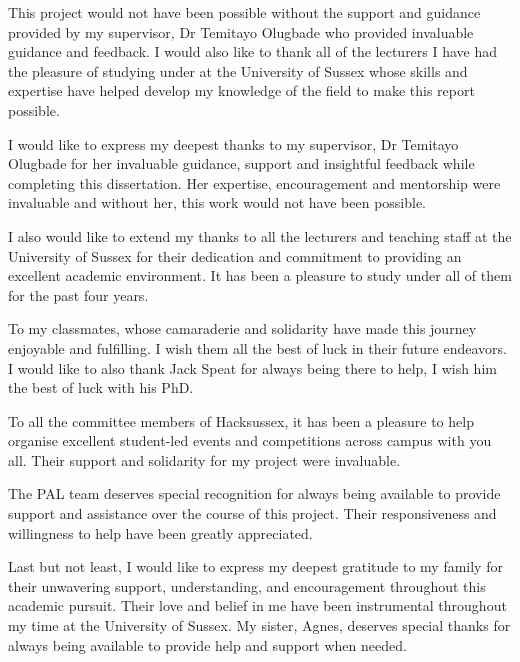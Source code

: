 \documentclass{report}
\begin{document}
This project would not have been possible without the support and guidance provided by my supervisor, Dr Temitayo Olugbade who provided invaluable guidance and feedback. I would also like to thank all of the lecturers I have had the pleasure of studying under at the University of Sussex whose skills and expertise have helped develop my knowledge of the field to make this report possible. 

I would like to express my deepest thanks to my supervisor, Dr Temitayo Olugbade for her invaluable guidance, support and insightful feedback while completing this dissertation. Her expertise, encouragement and mentorship were invaluable and without her, this work would not have been possible. 

I also would like to extend my thanks to all the lecturers and teaching staff at the University of Sussex for their dedication and commitment to providing an excellent academic environment. It has been a pleasure to study under all of them for the past four years. 

To my classmates, whose camaraderie and solidarity have made this journey enjoyable and fulfilling. I wish them all the best of luck in their future endeavors. I would like to also thank Jack Speat for always being there to help, I wish him the best of luck with his PhD. 

To all the committee members of Hacksussex, it has been a pleasure to help organise excellent student-led events and competitions across campus with you all. Their support and solidarity for my project were invaluable. 

The PAL team deserves special recognition for always being available to provide support and assistance over the course of this project. Their responsiveness and willingness to help have been greatly appreciated.

Last but not least, I would like to express my deepest gratitude to my family for their unwavering support, understanding, and encouragement throughout this academic pursuit. Their love and belief in me have been instrumental throughout my time at the University of Sussex. My sister, Agnes, deserves special thanks for always being available to provide help and support when needed. 
\end{document}
